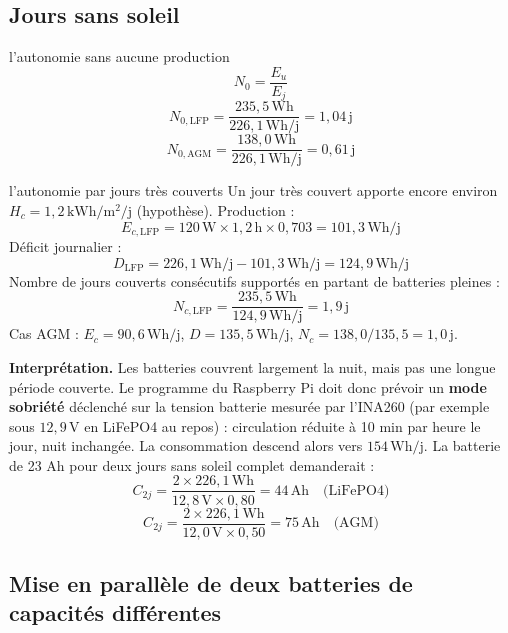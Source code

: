 \documentclass[11pt,a4paper]{article}
\newcommand{\U}[1]{\,\mathrm{#1}}
\begin{document}
\subsection{Jours sans soleil}

\begin{calcul}{l'autonomie sans aucune production}
\[
N_0 = \frac{E_u}{E_j}
\]
\[
N_{0,\text{LFP}} = \frac{235{,}5\U{Wh}}{226{,}1\U{Wh/j}} = 1{,}04\U{j}
\]
\[
N_{0,\text{AGM}} = \frac{138{,}0\U{Wh}}{226{,}1\U{Wh/j}} = 0{,}61\U{j}
\]
\end{calcul}

\begin{calcul}{l'autonomie par jours très couverts}
Un jour très couvert apporte encore environ $H_c = 1{,}2\U{kWh/m^2/j}$ (hypothèse). Production :
\[
E_{c,\text{LFP}} = 120\U{W} \times 1{,}2\U{h} \times 0{,}703 = 101{,}3\U{Wh/j}
\]
Déficit journalier :
\[
D_{\text{LFP}} = 226{,}1\U{Wh/j} - 101{,}3\U{Wh/j} = 124{,}9\U{Wh/j}
\]
Nombre de jours couverts consécutifs supportés en partant de batteries pleines :
\[
N_{c,\text{LFP}} = \frac{235{,}5\U{Wh}}{124{,}9\U{Wh/j}} = 1{,}9\U{j}
\]
Cas AGM : $E_c = 90{,}6\U{Wh/j}$, $D = 135{,}5\U{Wh/j}$, $N_c = 138{,}0 / 135{,}5 = 1{,}0\U{j}$.
\end{calcul}

\textbf{Interprétation.} Les batteries couvrent largement la nuit, mais pas une longue période couverte. Le programme du Raspberry Pi doit donc prévoir un \textbf{mode sobriété} déclenché sur la tension batterie mesurée par l'INA260 (par exemple sous $12{,}9\U{V}$ en LiFePO4 au repos) : circulation réduite à 10 min par heure le jour, nuit inchangée. La consommation descend alors vers $154\U{Wh/j}$. La batterie de 23 Ah pour deux jours sans soleil complet demanderait :
\[
C_{2j} = \frac{2 \times 226{,}1\U{Wh}}{12{,}8\U{V} \times 0{,}80} = 44\U{Ah} \quad \text{(LiFePO4)}
\]
\[
C_{2j} = \frac{2 \times 226{,}1\U{Wh}}{12{,}0\U{V} \times 0{,}50} = 75\U{Ah} \quad \text{(AGM)}
\]

\subsection{Mise en parallèle de deux batteries de capacités différentes}
\end{document}

